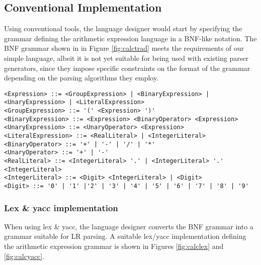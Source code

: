 \documentclass[preprint]{elsarticle}
\begin{document}
\subsection{Conventional Implementation}

Using conventional tools, the language designer would start by specifying the grammar defining the arithmetic expression language in a BNF-like notation.
The BNF grammar shown in in Figure \ref{fig:calctrad} meets the requirements of our simple language, albeit it is not yet suitable for being used with existing parser generators, since they impose specific constraints on the format of the grammar depending on the parsing algorithms they employ.

\begin{figure*}[tb!]
\begin{verbatim}
<Expression> ::= <GroupExpression> | <BinaryExpression> | <UnaryExpression> | <LiteralExpression>
<GroupExpression> ::= '(' <Expression> ')'
<BinaryExpression> ::= <Expression> <BinaryOperator> <Expression>
<UnaryExpression> ::= <UnaryOperator> <Expression>
<LiteralExpression> ::= <RealLiteral> | <IntegerLiteral>
<BinaryOperator> ::= '+' | '-' | '/' | '*'
<UnaryOperator> ::= '+' | '-'
<RealLiteral> ::= <IntegerLiteral> '.' | <IntegerLiteral> '.' <IntegerLiteral>
<IntegerLiteral> ::= <Digit> <IntegerLiteral> | <Digit>
<Digit> ::= '0' | '1' |'2' | '3' | '4' | '5' | '6' | '7' | '8' | '9'
\end{verbatim}
\caption{BNF grammar for the arithmetic expression language.} \label{fig:calctrad}
\end{figure*}

\subsubsection{Lex \& yacc implementation}

When using lex \& yacc, the language designer converts the BNF grammar into a grammar suitable for LR parsing.
A suitable lex/yacc implementation defining the arithmetic expression grammar is shown in Figures \ref{fig:calclex} and \ref{fig:calcyacc}.
\end{document}

